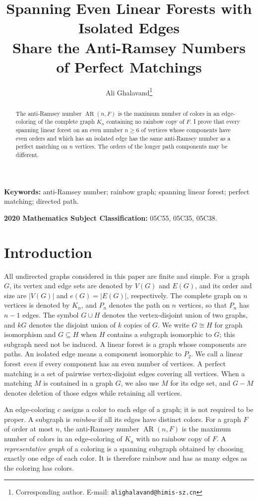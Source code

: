 \documentclass[12pt]{article}
\title{Spanning Even Linear Forests with Isolated Edges\\
	Share the Anti-Ramsey Numbers of Perfect Matchings}
\author[,a]{Ali Ghalavand\thanks{Corresponding author.
		E-mail: \texttt{alighalavand@himis-sz.cn}}}
\affil[a]{Hetao Institute of Mathematics and Interdisciplinary
	Sciences (HIMIS), Shenzhen 518000, Guangdong, P. R. China}
\date{}
\DeclareMathOperator{\AR}{AR}
\begin{document}
\maketitle

\begin{abstract}
The anti-Ramsey number $\AR(n,F)$ is the maximum number of colors in an
edge-coloring of the complete graph $K_n$ containing no rainbow copy of $F$.
I prove that every spanning linear forest on an even number $n\ge6$ of
vertices whose components have even orders and which has an isolated edge
has the same anti-Ramsey number as a perfect matching on $n$ vertices.
The orders of the longer path components may be different.
\end{abstract}

\noindent\textbf{Keywords:} anti-Ramsey number; rainbow graph; spanning linear
forest; perfect matching; directed path.

\medskip
\noindent\textbf{2020 Mathematics Subject Classification:} 05C55, 05C35, 05C38.

\section{Introduction}

All undirected graphs considered in this paper are finite and simple.
For a graph $G$, its vertex and edge sets are denoted by $V(G)$ and $E(G)$,
and its order and size are $|V(G)|$ and $e(G)=|E(G)|$, respectively.
The complete graph on $n$ vertices is denoted by $K_n$, and $P_n$ denotes
the path on $n$ vertices, so that $P_n$ has $n-1$ edges.
The symbol $G\cup H$ denotes the vertex-disjoint union of two graphs,
and $kG$ denotes the disjoint union of $k$ copies of $G$.
We write $G\cong H$ for graph isomorphism and $G\subseteq H$ when $H$
contains a subgraph isomorphic to $G$; this subgraph need not be induced.
A linear forest is a graph whose components are paths. An isolated edge
means a component isomorphic to $P_2$. We call a linear forest \emph{even} if every
component has an even number of vertices. A perfect matching is a set of
pairwise vertex-disjoint edges covering all vertices. When a matching $M$ is contained in
a graph $G$, we also use $M$ for its edge set, and $G-M$ denotes deletion
of those edges while retaining all vertices.

An edge-coloring $c$ assigns a color to each edge of a graph; it is not
required to be proper. A subgraph is \emph{rainbow} if all its edges have
distinct colors. For a graph $F$ of order at most $n$, the anti-Ramsey number
$\AR(n,F)$ is the maximum number of colors in an edge-coloring of $K_n$
with no rainbow copy of $F$. A \emph{representative graph} of a coloring is a spanning subgraph obtained
by choosing exactly one edge of each color. It is therefore rainbow and
has as many edges as the coloring has colors.
\end{document}
